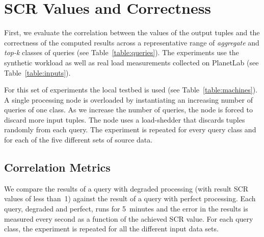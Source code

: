 \vspace{-10pt}
\section{SCR Values and Correctness}

First, we evaluate the correlation between the \sic values of the output tuples and the correctness of
the computed results across a representative range of \emph{aggregate} and \emph{top-k} classes of
queries (see Table~\ref{table:queries}). 
The experiments use the synthetic workload as well as real load measurements collected on PlanetLab
(see Table~\ref{table:inputs}).
% 
%

For this set of experiments the local testbed is used (see Table~\ref{table:machines}). A single \sys
processing node is overloaded by instantiating an increasing number of queries of one class. As we increase the number of queries, the node is forced to discard
more input tuples. The node uses a load-shedder that discards tuples randomly from each query.
The experiment is repeated for every query class and for each of the five different sets of source data. 
\vspace{-10pt}
\subsection*{Correlation Metrics}

We compare the results of a query with degraded processing (\ie with result SCR values of less
than~1) against the result of a query with perfect processing. Each query, degraded and perfect, runs
for 5~minutes and the error in the results is measured every second as a function of the achieved SCR
value. For each query class, the experiment is repeated for all the different input data sets.

